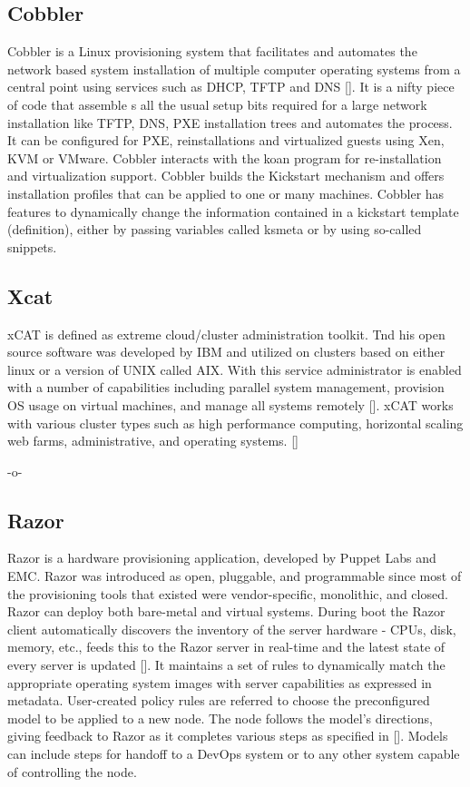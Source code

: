 \subsection{Cobbler}

Cobbler is a Linux provisioning system that facilitates and automates
the network based system installation of multiple computer operating
systems from a central point using services such as DHCP, TFTP and
DNS [\cite{www-cobbler}]. It is a nifty piece of code that assemble s
all the usual setup bits required for a large network installation
like TFTP, DNS, PXE installation trees and automates the process. It
can be configured for PXE, reinstallations and virtualized guests
using Xen, KVM or VMware.  Cobbler interacts with the koan program for
re-installation and virtualization support.  Cobbler builds the
Kickstart mechanism and offers installation profiles that can be
applied to one or many machines.  Cobbler has features to dynamically
change the information contained in a kickstart template (definition),
either by passing variables called ksmeta or by using so-called
snippets.

\subsection{Xcat}

xCAT is defined as extreme cloud/cluster administration toolkit. Tnd
his open source software was developed by IBM and utilized on clusters
based on either linux or a version of UNIX called AIX. With this
service administrator is enabled with a number of capabilities
including parallel system management, provision OS usage on virtual
machines, and manage all systems remotely [\cite{www-xcat}]. xCAT works
with various cluster types such as high performance computing,
horizontal scaling web farms, administrative, and operating
systems. [\cite{www-03ibm}]

     -o-
     
\subsection{Razor}

Razor is a hardware provisioning application, developed by Puppet Labs
and EMC. Razor was introduced as open, pluggable, and programmable
since most of the provisioning tools that existed were
vendor-specific, monolithic, and closed. Razor can deploy both
bare-metal and virtual systems. During boot the Razor client
automatically discovers the inventory of the server hardware - CPUs,
disk, memory, etc., feeds this to the Razor server in real-time and
the latest state of every server is updated [\cite{www-RazorWiki}]. It
maintains a set of rules to dynamically match the appropriate
operating system images with server capabilities as expressed in
metadata. User-created policy rules are referred to choose the
preconfigured model to be applied to a new node. The node follows the
model's directions, giving feedback to Razor as it completes various
steps as specified in [\cite{www-RazorPuppet}]. Models can include steps
for handoff to a DevOps system or to any other system capable of
controlling the node.

